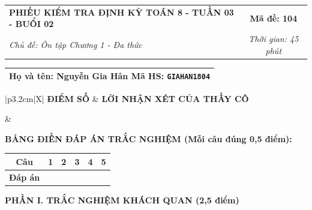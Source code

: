 \documentclass[12pt,a4paper]{article}
\begin{document}
\newpage


\noindent
\begin{tabularx}{\linewidth}{|X|c|}
\hline
\textbf{PHIẾU KIỂM TRA ĐỊNH KỲ TOÁN 8 - TUẦN 03 - BUỔI 02} & \textbf{Mã đề: 104} \\
\textit{Chủ đề: Ôn tập Chương 1 - Đa thức} & \textit{Thời gian: 45 phút} \\
\hline
\end{tabularx}

\vspace{1mm}

\noindent
\begin{tabularx}{\linewidth}{|X|}
\hline
\rule[-2mm]{0pt}{7.5mm}\textbf{Họ và tên:} \textbf{\large Nguyễn Gia Hân} \hfill \textbf{Mã HS:} \texttt{GIAHAN1804} \quad \\
\hline
\end{tabularx}

\vspace{1mm}

\noindent
\begin{tabularx}{\linewidth}{|p{3.2cm}|X|}
\hline
\centering\textbf{ĐIỂM SỐ} & \centering\textbf{LỜI NHẬN XÉT CỦA THẦY CÔ} \tabularnewline
\hline
\rule{0pt}{1.3cm} & \tabularnewline
\hline
\end{tabularx}

\vspace{1.2mm}

\noindent\textbf{BẢNG ĐIỀN ĐÁP ÁN TRẮC NGHIỆM (Mỗi câu đúng 0,5 điểm):}
\vspace{0.8mm}

\noindent
\renewcommand{\arraystretch}{1.35}
\begin{tabularx}{\linewidth}{|c|*{5}{>{\centering\arraybackslash}X|}}
\hline
\textbf{Câu} & \textbf{1} & \textbf{2} & \textbf{3} & \textbf{4} & \textbf{5} \\
\hline
\textbf{Đáp án} & & & & & \\
\hline
\end{tabularx}
\renewcommand{\arraystretch}{1.0}

\vspace{1.5mm}

\noindent\textbf{\large PHẦN I. TRẮC NGHIỆM KHÁCH QUAN (2,5 điểm)}
\vspace{1mm}
\end{document}
